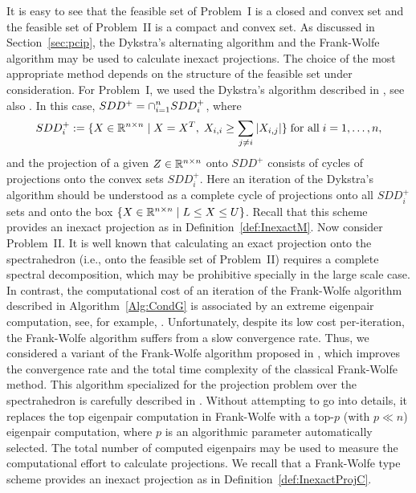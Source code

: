 It is easy to see that the feasible set of Problem~I is a closed and convex set and the feasible set of Problem~II is  a compact and convex set.
As discussed in Section~\ref{sec:pcip}, the Dykstra's alternating algorithm and the Frank-Wolfe algorithm may be used to calculate inexact projections. The choice of the most appropriate method depends on the structure of the feasible set under consideration.
For Problem~I, we used the Dykstra's algorithm described in \cite{BirginMartinezRaydan2003}, see also \cite{dykstraSDD}. In this case, $SDD^+=\displaystyle\cap_{i=1}^n SDD^+_i$, where
$$SDD^+_i :=\{X\in\mathbb{R}^{n\times n}\mid X=X^T, \; X_{i,i}\geq \displaystyle\sum_{j\neq i}|X_{i,j}| \} \; \mbox{for all} \; i=1,\ldots,n,$$
and the projection of a given $Z\in\mathbb{R}^{n\times n}$ onto $SDD^+$ consists of cycles of projections onto the convex sets $SDD^+_i$.
Here an iteration of the Dykstra's algorithm should be understood as a complete cycle of projections onto all $SDD^+_i $ sets and onto the box $\{X\in\mathbb{R}^{n\times n}\mid L\leq X\leq U\}$.
Recall that this scheme provides an inexact projection as in Definition~\ref{def:InexactM}.
%
Now consider Problem~II. It is well known that calculating an exact projection onto the spectrahedron (i.e., onto the feasible set of Problem~II) requires a complete spectral decomposition, which may be prohibitive specially in the large scale case. In contrast, the computational cost of an iteration of the Frank-Wolfe algorithm described in Algorithm~\ref{Alg:CondG} is associated by an extreme eigenpair computation, see, for example, \cite{Jaggi2013}. Unfortunately, despite its low cost per-iteration, the Frank-Wolfe algorithm suffers from a slow convergence rate.
Thus, we considered a variant of the Frank-Wolfe algorithm proposed in \cite{allen2017linear}, which improves the convergence rate and the total time complexity of the classical Frank-Wolfe method. This algorithm specialized for the projection problem over the spectrahedron is carefully described in \cite{aguiar2021inexact}.
Without attempting to go into details, it replaces the top eigenpair computation in Frank-Wolfe with a top-$p$ (with $p\ll n$) eigenpair computation, where $p$ is an algorithmic parameter automatically selected.
The total number of computed eigenpairs may be used to measure the computational effort to calculate projections.
We recall that a Frank-Wolfe type scheme provides an inexact projection as in Definition~\ref{def:InexactProjC}.


